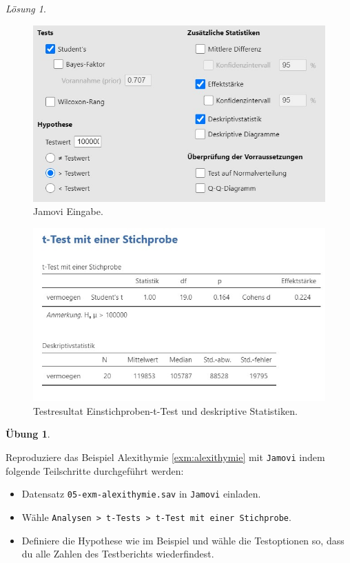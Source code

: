 \documentclass[
]{book}
\providecommand{\tightlist}{%
  \setlength{\itemsep}{0pt}\setlength{\parskip}{0pt}}
\theoremstyle{definition}
\theoremstyle{definition}
\theoremstyle{definition}
\newtheorem{exercise}{Übung}[chapter]
\theoremstyle{definition}
\theoremstyle{remark}
\newtheorem*{solution}{Lösung}
\begin{document}
\begin{solution}
\leavevmode

\begin{figure}
\includegraphics[width=1\linewidth]{figures/05-exr-vermoegen-jmv-input} \caption{Jamovi Eingabe.}\label{fig:sol-vermoegen-input}
\end{figure}

\begin{figure}
\includegraphics[width=1\linewidth]{figures/05-exr-vermoegen-jmv-output} \caption{Testresultat Einstichproben-t-Test und deskriptive Statistiken.}\label{fig:sol-vermoegen-output}
\end{figure}

\end{solution}

\begin{exercise}
\protect\hypertarget{exr:alexithymie}{}\label{exr:alexithymie}\leavevmode

Reproduziere das Beispiel Alexithymie \ref{exm:alexithymie} mit \texttt{Jamovi} indem folgende Teilschritte durchgeführt werden:

\begin{itemize}
\tightlist
\item
  Datensatz \texttt{05-exm-alexithymie.sav} in \texttt{Jamovi} einladen.
\item
  Wähle \texttt{Analysen\ \textgreater{}\ t-Tests\ \textgreater{}\ t-Test\ mit\ einer\ Stichprobe}.
\item
  Definiere die Hypothese wie im Beispiel und wähle die Testoptionen so, dass du alle Zahlen des Testberichts wiederfindest.
\end{itemize}

\end{exercise}
\end{document}
